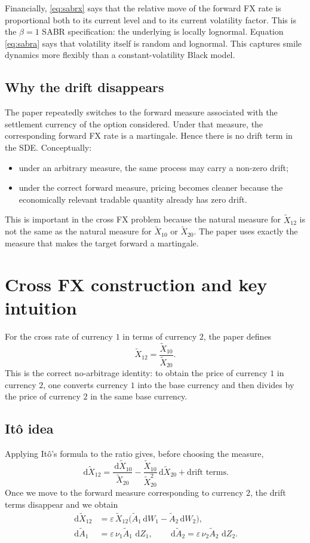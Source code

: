 \documentclass[11pt]{article}
\newcommand{\dd}{\,\mathrm{d}}
\newcommand{\eps}{\varepsilon}
\newcommand{\X}{\widetilde{X}}
\newcommand{\Vol}{\widetilde{A}}
\begin{document}
Financially, \eqref{eq:sabrx} says that the relative move of the forward FX rate is proportional both to its current level and to its current volatility factor. This is the \(\beta=1\) SABR specification: the underlying is locally lognormal. Equation \eqref{eq:sabra} says that volatility itself is random and lognormal. This captures smile dynamics more flexibly than a constant-volatility Black model.

\subsection*{Why the drift disappears}

The paper repeatedly switches to the forward measure associated with the settlement currency of the option considered. Under that measure, the corresponding forward FX rate is a martingale. Hence there is no drift term in the SDE. Conceptually:
\begin{itemize}
    \item under an arbitrary measure, the same process may carry a non-zero drift;
    \item under the correct forward measure, pricing becomes cleaner because the economically relevant tradable quantity already has zero drift.
\end{itemize}

This is important in the cross FX problem because the natural measure for \(\X_{12}\) is not the same as the natural measure for \(\X_{10}\) or \(\X_{20}\). The paper uses exactly the measure that makes the target forward a martingale.

\section{Cross FX construction and key intuition}

For the cross rate of currency \(1\) in terms of currency \(2\), the paper defines
\[
\X_{12}=\frac{\X_{10}}{\X_{20}}.
\]
This is the correct no-arbitrage identity: to obtain the price of currency \(1\) in currency \(2\), one converts currency \(1\) into the base currency and then divides by the price of currency \(2\) in the same base currency.

\subsection*{It\^o idea}

Applying It\^o's formula to the ratio gives, before choosing the measure,
\[
\dd \X_{12}
=\frac{\dd \X_{10}}{\X_{20}}
-\frac{\X_{10}}{\X_{20}^2}\dd \X_{20}
+ \text{drift terms}.
\]
Once we move to the forward measure corresponding to currency \(2\), the drift terms disappear and we obtain
\begin{align}
\dd \X_{12} &= \eps\, \X_{12}\bigl(\Vol_1 \dd W_1-\Vol_2 \dd W_2\bigr), \label{eq:cross-dyn}\\
\dd \Vol_1 &= \eps\, \nu_1 \Vol_1\,\dd Z_1, \qquad
\dd \Vol_2 = \eps\, \nu_2 \Vol_2\,\dd Z_2. \label{eq:cross-vols}
\end{align}
\end{document}
